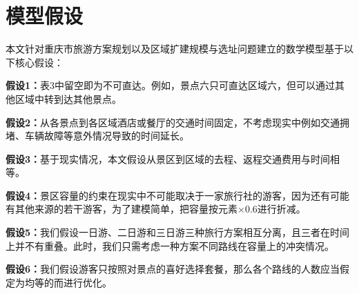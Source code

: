 \chapter[\hspace{0pt}模型假设]{{\heiti{}\hspace{0pt}模型假设}}\label{chapter2:模型假设}

\removelofgap
\removelotgap

本文针对重庆市旅游方案规划以及区域扩建规模与选址问题建立的数学模型基于以下核心假设：

\textbf{假设1：}表3中留空即为不可直达。例如，景点六只可直达区域六，但可以通过其他区域中转到达其他景点。

\textbf{假设2：}从各景点到各区域酒店或餐厅的交通时间固定，不考虑现实中例如交通拥堵、车辆故障等意外情况导致的时间延长。

\textbf{假设3：}基于现实情况，本文假设从景区到区域的去程、返程交通费用与时间相等。

\textbf{假设4：}景区容量的约束在现实中不可能取决于一家旅行社的游客，因为还有可能有其他来源的若干游客，为了建模简单，把容量按元素$\times 0.6$进行折减。

\textbf{假设5：}我们假设一日游、二日游和三日游三种旅行方案相互分离，且三者在时间上并不有重叠。此时，我们只需考虑一种方案不同路线在容量上的冲突情况。

\textbf{假设6：}我们假设游客只按照对景点的喜好选择套餐，那么各个路线的人数应当假定为均等的而进行优化。
